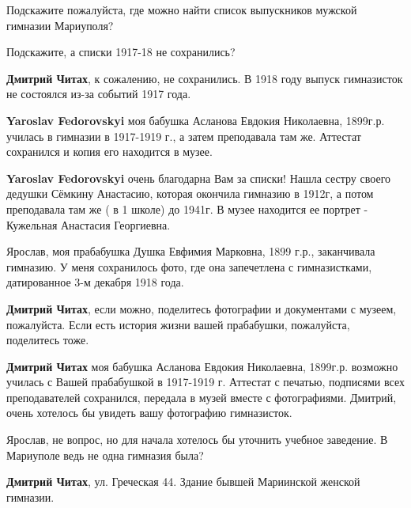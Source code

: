 
Подскажите пожалуйста, где можно найти список выпускников мужской гимназии Мариуполя?


Подскажите, а списки 1917-18 не сохранились?

\begin{itemize} %
\textbf{Дмитрий Читах}, к сожалению, не сохранились. В 1918 году выпуск гимназисток не состоялся из-за событий 1917 года.

\begin{itemize} %
\textbf{Yaroslav Fedorovskyi} моя бабушка Асланова Евдокия Николаевна, 1899г.р. училась в гимназии в 1917-1919 г., а затем преподавала там же. Аттестат сохранился и копия его находится в музее.

\textbf{Yaroslav Fedorovskyi} очень благодарна Вам за списки! Нашла сестру своего дедушки Сёмкину Анастасию, которая окончила гимназию в 1912г, а потом преподавала там же ( в 1 школе) до 1941г. В музее находится ее портрет - Кужельная Анастасия Георгиевна. 
\end{itemize} %


Ярослав, моя прабабушка Душка Евфимия Марковна, 1899 г.р., заканчивала
гимназию. У меня сохранилось фото, где она запечетлена с гимназистками,
датированное 3-м декабря 1918 года.

\begin{itemize} %
\textbf{Дмитрий Читах}, если можно, поделитесь фотографии и документами с музеем, пожалуйста.
Если есть история жизни вашей прабабушки, пожалуйста, поделитесь тоже.

\textbf{Дмитрий Читах} моя бабушка Асланова Евдокия Николаевна, 1899г.р. возможно училась с Вашей прабабушкой в 1917-1919 г. Аттестат с печатью, подписями всех преподавателей сохранился, передала в музей вместе с фотографиями. Дмитрий, очень хотелось бы увидеть вашу фотографию гимназисток. 
\end{itemize} %


Ярослав, не вопрос, но для начала хотелось бы уточнить учебное заведение. В Мариуполе ведь не одна гимназия была?

\begin{itemize} %
\textbf{Дмитрий Читах}, ул. Греческая 44. Здание бывшей Мариинской женской гимназии.


\end{itemize}
\end{itemize}
